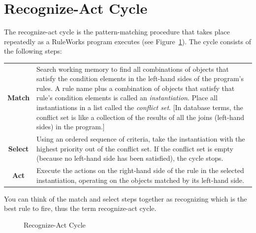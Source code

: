 \section{Recognize-Act Cycle}

The recognize-act cycle is the pattern-matching procedure that takes
place repeatedly as a RuleWorks program executes (see
Figure~\ref{f:1-3}). The cycle consists of the following steps:

\begin{center}
  \begin{tabularx}{\columnwidth}{cX}
    \textbf{Match}  & Search working memory to find
                      all combinations of objects
                      that satisfy the condition  
                      elements in the left-hand sides 
                      of the program's rules. A rule 
                      name plus a combination of     
                      objects that satisfy that     
                      rule's condition elements is    
                      called an \emph{instantiation}. Place 
                      all instantiations in a list   
                      called the \emph{conflict set}. [In   
                      database terms, the conflict    
                      set is like a collection of the 
                      results of all the joins        
                      (left-hand sides) in the
                      program.] \\\addlinespace
    \textbf{Select} & Using an ordered sequence of  
                      criteria, take the             
                      instantiation with the highest 
                      priority out of the conflict    
                      set. If the conflict set is     
                      empty (because no left-hand     
                      side has been satisfied), the   
                      cycle stops. \\\addlinespace
    \textbf{Act}    & Execute the actions on the      
                      right-hand side of the rule in  
                      the selected instantiation,     
                      operating on the objects       
                      matched by its left-hand side. 
  \end{tabularx}
\end{center}

You can think of the match and select steps together as recognizing
which is the best rule to fire, thus the term recognize-act cycle.

\begin{figure}[h]
  \centering
  
  \caption{Recognize-Act Cycle}
  \label{f:1-3}
\end{figure}

